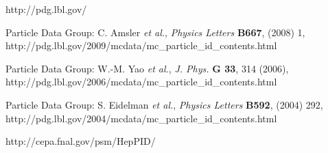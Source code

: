 
\def\etal{{\it et al.}}

\begin{thebibliography}{4}

http://pdg.lbl.gov/ 

Particle Data Group: C. Amsler \etal, \emph{Physics Letters} \textbf{B667}, (2008) 1, 
\newline
http://pdg.lbl.gov/2009/mcdata/mc\_particle\_id\_contents.html

Particle Data Group: W.-M. Yao \etal, \emph{J. Phys.} \textbf{G 33}, 314 (2006), 
\newline
http://pdg.lbl.gov/2006/mcdata/mc\_particle\_id\_contents.html

Particle Data Group: S. Eidelman  \etal, \emph{Physics Letters} \textbf{B592}, (2004) 292,
\newline
http://pdg.lbl.gov/2004/mcdata/mc\_particle\_id\_contents.html

http://cepa.fnal.gov/psm/HepPID/

\end{thebibliography}
\newpage


